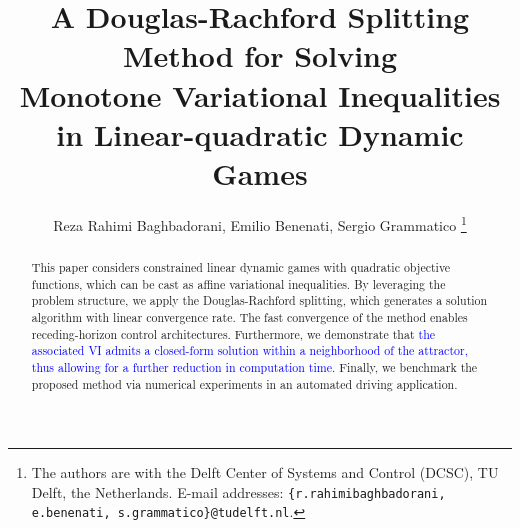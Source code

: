 \documentclass[letterpaper, 10 pt, conference]{ieeeconf}  %
\title{\LARGE \bf
A Douglas-Rachford Splitting Method for Solving \\
Monotone Variational Inequalities in Linear-quadratic Dynamic Games
}
\author{Reza Rahimi Baghbadorani, Emilio Benenati, Sergio Grammatico %
\thanks{The authors are with the Delft Center of Systems and
Control (DCSC), TU Delft, the Netherlands. E-mail addresses:
{\tt\small \{r.rahimibaghbadorani, e.benenati,  s.grammatico\}@tudelft.nl}.}%
}
\newcommand{\edit}[1]{\textcolor{blue}{#1}}
\begin{document}
\maketitle
\thispagestyle{empty}
\pagestyle{empty}


\begin{abstract}
This paper considers constrained linear dynamic games with quadratic objective functions, which can be cast as affine variational inequalities. By leveraging the problem structure, we apply the Douglas-Rachford splitting, which generates a solution algorithm with linear convergence rate. The fast convergence of the method enables receding-horizon control architectures. Furthermore, we demonstrate that \edit{the associated VI admits a closed-form solution within a neighborhood of the attractor, thus allowing for a further reduction in computation time.} Finally, we benchmark the proposed method via numerical experiments in an automated driving application.
\end{abstract}
\end{document}
